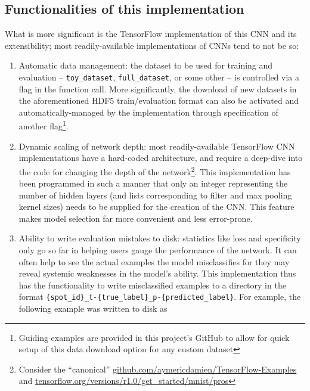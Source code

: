 \documentclass[a4paper, 11pt]{article} %
\begin{document}
	\subsection{Functionalities of this implementation}
		What is more significant is the TensorFlow implementation 
		of 
		this CNN and its
		extensibility; most readily-available implementations of CNNs tend to 
		not 
		be so:
		\begin{enumerate}
			\item Automatic data management: the dataset to be used for 
			training and evaluation -- \texttt{toy\_dataset}, 
			\texttt{full\_dataset}, or some other -- is controlled via a flag 
			in 
			the function call. More significantly, the download of new datasets 
			in the aforementioned HDF5 train/evaluation format can also be 
			activated and automatically-managed by the implementation through 
			specification of another flag\footnote{Guiding examples are 
			provided in this project's GitHub to allow for quick setup of this 
			data download option for any custom dataset}.
			\item Dynamic scaling of network depth: most readily-available 
			TensorFlow CNN implementations have a hard-coded architecture, and 
			require a deep-dive into the code for changing the depth of the 
			network\footnote{Consider the ``canonical''
			\hyperlink{https://github.com/aymericdamien/TensorFlow-Examples}
			{github.com/aymericdamien/TensorFlow-Examples} and 
			\hyperlink{https://www.tensorflow.org/versions/r1.0/get\_started/mnist/pros}
			{tensorflow.org/versions/r1.0/get\_started/mnist/pros}}. This 
			implementation has been programmed in such a manner 
			that only an integer representing the number of hidden layers (and 
			lists corresponding to filter and max pooling kernel sizes) needs 
			to be supplied for the creation of the CNN. This feature makes 
			model selection far more convenient and less error-prone.
			\item Ability to write evaluation mistakes to disk: statistics like 
			loss and specificity only go so far in helping users gauge the 
			performance of the network. It can often help to see the actual 
			examples the model misclassifies for they may reveal systemic 
			weaknesses in the model's ability. This implementation thus has the 
			functionality to write misclassified examples to a directory in the 
			format 
			\texttt{\{spot\_id\}\_t-\{true\_label\}\_p-\{predicted\_label\}}. 
			For 
			example, the following example was written to disk as 
			\begin{figure}[H]

\end{figure}
\end{enumerate}
\end{document}

